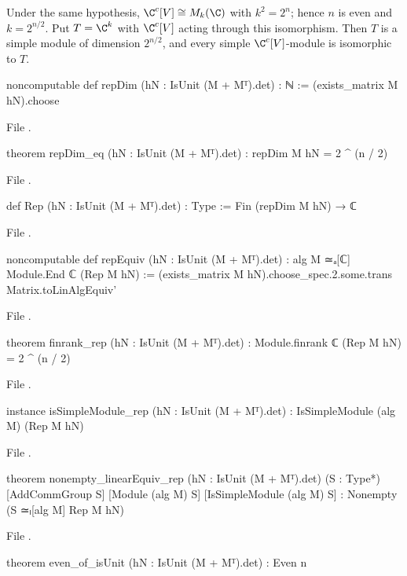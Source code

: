 \begin{theorem}\label{ch06:thm:repdim}
Under the same hypothesis, $\C^c[V]\cong M_k(\C)$ with $k^2=2^n$; hence $n$ is even and
$k=2^{n/2}$.  Put $T=\C^k$ with $\C^c[V]$ acting through this isomorphism.  Then $T$ is a simple
module of dimension $2^{n/2}$, and every simple $\C^c[V]$-module is isomorphic to $T$.
\end{theorem}
\begin{leancode}
noncomputable def repDim (hN : IsUnit (M + Mᵀ).det) : ℕ := (exists_matrix M hN).choose
\end{leancode}
\noindent File .
\begin{leancode}
theorem repDim_eq (hN : IsUnit (M + Mᵀ).det) : repDim M hN = 2 ^ (n / 2)
\end{leancode}
\noindent File .
\begin{leancode}
def Rep (hN : IsUnit (M + Mᵀ).det) : Type := Fin (repDim M hN) → ℂ
\end{leancode}
\noindent File .
\begin{leancode}
noncomputable def repEquiv (hN : IsUnit (M + Mᵀ).det) : alg M ≃ₐ[ℂ] Module.End ℂ (Rep M hN) :=
  (exists_matrix M hN).choose_spec.2.some.trans Matrix.toLinAlgEquiv'
\end{leancode}
\noindent File .
\begin{leancode}
theorem finrank_rep (hN : IsUnit (M + Mᵀ).det) :
    Module.finrank ℂ (Rep M hN) = 2 ^ (n / 2)
\end{leancode}
\noindent File .
\begin{leancode}
instance isSimpleModule_rep (hN : IsUnit (M + Mᵀ).det) : IsSimpleModule (alg M) (Rep M hN)
\end{leancode}
\noindent File .
\begin{leancode}
theorem nonempty_linearEquiv_rep (hN : IsUnit (M + Mᵀ).det) (S : Type*) [AddCommGroup S]
    [Module (alg M) S] [IsSimpleModule (alg M) S] :
    Nonempty (S ≃ₗ[alg M] Rep M hN)
\end{leancode}
\noindent File .
\begin{leancode}
theorem even_of_isUnit (hN : IsUnit (M + Mᵀ).det) : Even n
\end{leancode}
